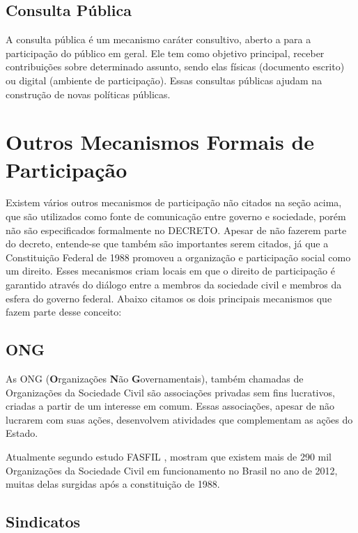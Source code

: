 \subsection*{Consulta Pública}

A consulta pública é um mecanismo caráter consultivo, aberto a para a participação do público em geral. Ele tem como objetivo principal, receber contribuições sobre determinado assunto, sendo elas físicas (documento escrito) ou digital (ambiente de participação). Essas consultas públicas ajudam na construção de novas políticas públicas.

\section{Outros Mecanismos Formais de Participação}

Existem vários outros mecanismos de participação não citados na seção acima, que são utilizados como fonte de comunicação entre governo e sociedade, porém não são especificados formalmente no DECRETO. Apesar de não fazerem parte do decreto, entende-se que também são importantes serem citados, já que a Constituição Federal de 1988 promoveu a organização e participação social como um direito. Esses mecanismos criam locais em que o direito de participação é garantido através do diálogo entre a membros da sociedade civil e membros da esfera do governo federal. Abaixo citamos os dois principais mecanismos que fazem parte desse conceito:

\subsection*{ONG}

As ONG (\textbf{O}rganizações \textbf{N}ão \textbf{G}overnamentais), também chamadas de Organizações da Sociedade Civil são associações privadas sem fins lucrativos, criadas a partir de um interesse em comum. Essas associações, apesar de não lucrarem com suas ações, desenvolvem atividades que complementam as ações do Estado.

Atualmente segundo estudo FASFIL \cite{ibge2012ongs}, mostram que existem mais de 290 mil Organizações da Sociedade Civil em funcionamento no Brasil no ano de 2012, muitas delas surgidas após a constituição de 1988.

\subsection*{Sindicatos}

